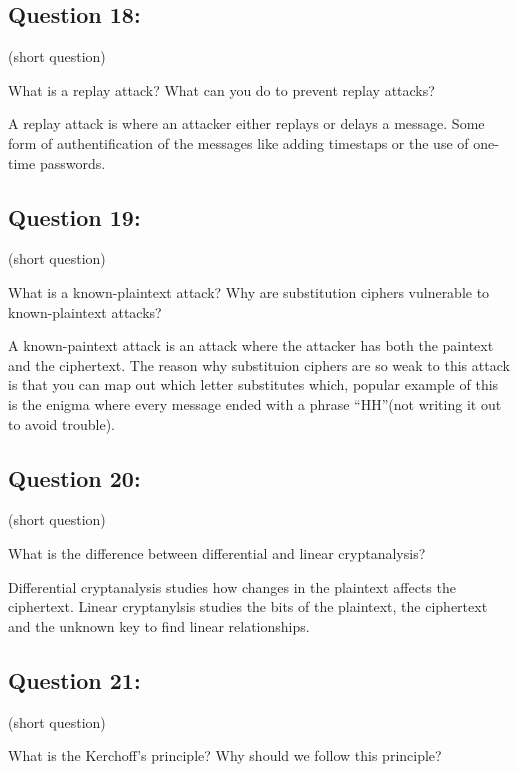 \documentclass[11pt]{article}
\begin{document}
    \hypertarget{question-18}{%
\subsection{Question 18:}\label{question-18}}

(short question)

What is a replay attack? What can you do to prevent replay attacks?

    A replay attack is where an attacker either replays or delays a message.
Some form of authentification of the messages like adding timestaps or
the use of one-time passwords.

    \hypertarget{question-19}{%
\subsection{Question 19:}\label{question-19}}

(short question)

What is a known-plaintext attack? Why are substitution ciphers
vulnerable to known-plaintext attacks?

    A known-paintext attack is an attack where the attacker has both the
paintext and the ciphertext. The reason why substituion ciphers are so
weak to this attack is that you can map out which letter substitutes
which, popular example of this is the enigma where every message ended
with a phrase ``HH''(not writing it out to avoid trouble).

    \hypertarget{question-20}{%
\subsection{Question 20:}\label{question-20}}

(short question)

What is the difference between differential and linear cryptanalysis?

    Differential cryptanalysis studies how changes in the plaintext affects
the ciphertext. Linear cryptanylsis studies the bits of the plaintext,
the ciphertext and the unknown key to find linear relationships.

    \hypertarget{question-21}{%
\subsection{Question 21:}\label{question-21}}

(short question)

What is the Kerchoff's principle? Why should we follow this principle?
\end{document}
